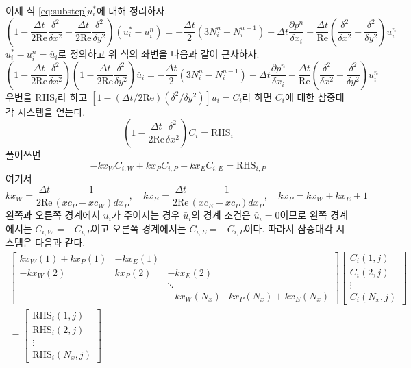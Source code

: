 \documentclass[a4paper, 10pt]{article}
\renewcommand{\Re}{\mathrm{Re}}
\newcommand{\RHS}{\mathrm{RHS}}
\begin{document}
이제 식 \eqref{eq:substep}\를 $u_i^*$에 대해 정리하자.
\begin{equation}
    \left( 1 - \frac{\Delta t}{2\Re} \frac{\delta^2}{\delta x^2} - \frac{\Delta t}{2\Re} \frac{\delta^2}{\delta y^2} \right) (u_i^* - u_i^n)
    = -\frac{\Delta t}{2}(3N_i^n - N_i^{n-1}) - \Delta t \frac{\partial p^n}{\delta x_i}
    + \frac{\Delta t}{\Re} \left( \frac{\delta^2}{\delta x^2} + \frac{\delta^2}{\delta y^2} \right) u_i^n
\end{equation}
$u_i^* - u_i^n = \bar{u}_i$로 정의하고 위 식의 좌변을 다음과 같이 근사하자.
\begin{equation}
    \left( 1 - \frac{\Delta t}{2\Re} \frac{\delta^2}{\delta x^2} \right)
    \left( 1 - \frac{\Delta t}{2\Re} \frac{\delta^2}{\delta y^2} \right) \bar{u}_i
    = -\frac{\Delta t}{2}(3N_i^n - N_i^{n-1}) - \Delta t \frac{\partial p^n}{\delta x_i}
    + \frac{\Delta t}{\Re} \left( \frac{\delta^2}{\delta x^2} + \frac{\delta^2}{\delta y^2} \right) u_i^n
\end{equation}
우변을 $\RHS_i$라 하고 $[1 - (\Delta t/2\Re)(\delta^2/\delta y^2)]\bar{u}_i = C_i$라 하면 $C_i$에 대한 삼중대각 시스템을 얻는다.
\begin{equation}
    \left( 1 - \frac{\Delta t}{2\Re} \frac{\delta^2}{\delta x^2} \right) C_i = \RHS_i
\end{equation}
풀어쓰면
\begin{equation}
    -kx_W C_{i, W} + kx_P C_{i, P} - kx_E C_{i, E} = \RHS_{i, P}
\end{equation}
여기서
\begin{equation}
    kx_W = \frac{\Delta t}{2\Re} \frac{1}{(xc_P-xc_W)dx_P}, \quad kx_E = \frac{\Delta t}{2\Re} \frac{1}{(xc_E-xc_P)dx_P}, \quad kx_P = kx_W + kx_E + 1
\end{equation}
왼쪽과 오른쪽 경계에서 $u_i$가 주어지는 경우 $\bar{u}_i$의 경계 조건은 $\bar{u}_i=0$이므로 왼쪽 경계에서는 $C_{i, W} = -C_{i, P}$이고
오른쪽 경계에서는 $C_{i, E} = -C_{i, P}$이다. 따라서 삼중대각 시스템은 다음과 같다.
\begin{multline}
    \begin{bmatrix}
        kx_W(1) + kx_P(1) & -kx_E(1) & & \\
        -kx_W(2) & kx_P(2) & -kx_E(2) & \\
        & & \ddots & \\
        & & -kx_W(N_x) & kx_P(N_x) + kx_E(N_x)
    \end{bmatrix}
    \begin{bmatrix}
        C_i(1, j) \\
        C_i(2, j) \\
        \vdots \\
        C_i(N_x, j)
    \end{bmatrix} \\
    =
    \begin{bmatrix}
        \RHS_i(1, j) \\
        \RHS_i(2, j) \\
        \vdots \\
        \RHS_i(N_x, j)
    \end{bmatrix}
\end{multline}
\end{document}
